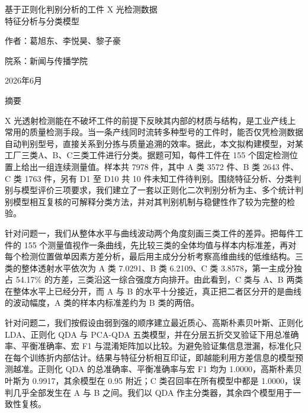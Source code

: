 \documentclass[12pt,a4paper]{article}
\begin{document}
\songti\linespread{1}\selectfont
\hypersetup{pageanchor=false}

\begin{titlepage}
\thispagestyle{empty}
\centering
\vspace*{8em}
{\heiti 基于正则化判别分析的工件 X 光检测数据\\[0.5em]特征分析与分类模型\par}
\vspace{6em}
{\songti 作者：葛旭东、李悦昊、黎子豪\par}
\vspace{2em}
{\songti 院系：新闻与传播学院\par}
\vfill
{\songti 2026年6月\par}
\end{titlepage}

\thispagestyle{empty}
\begin{center}
	{\heiti 摘\quad 要}
\end{center}

X 光透射检测能在不破坏工件的前提下反映其内部的材质与结构，是工业产线上常用的质量检测手段。当一条产线同时流转多种型号的工件时，能否仅凭检测数据自动判别型号，直接关系到分拣与质量追溯的效率。据此，本文拟构建模型，对某工厂三类A、B、C三类工件进行分类。据题可知，每件工件在 155 个固定检测位置上给出一组连续测量值。样本共 7978 件，其中 A 类 3572 件、B 类 2643 件、C 类 1763 件，另有 D1 至 D10 共 10 件未知工件待判别。围绕特征分析、分类判别与模型评价三项要求，我们建立了一套以正则化二次判别分析为主、多个统计判别模型相互复核的可解释分类方法，并对其判别机制与稳健性作了较为完整的检验。

针对问题一，我们从整体水平与曲线波动两个角度刻画三类工件的差异。把每件工件的 155 个测量值视作一条曲线，先比较三类的全体均值与样本内标准差，再对每个检测位置做单因素方差分析，最后用主成分分析考察高维曲线的低维结构。三类的整体透射水平依次为 A 类 7.0291、B 类 6.2109、C 类 3.8578，第一主成分独占 54.17\% 的方差，三类沿这一综合强度方向排开。由此看到，C 类与 A、B 两类在整体水平上已经分开，而 A 与 B 的水平十分接近，真正把二者区分开的是曲线的波动幅度，A 类的样本内标准差约为 B 类的两倍。

针对问题二，我们按假设由弱到强的顺序建立最近质心、高斯朴素贝叶斯、正则化 LDA、正则化 QDA 与 PCA-QDA 五类模型，并在分层五折交叉验证下用总准确率、平衡准确率、宏 F1 与混淆矩阵加以比较。为避免验证集信息泄漏，标准化只在每个训练折内部估计。结果与特征分析相互印证，即越能利用方差信息的模型预测越准。正则化 QDA 的总准确率、平衡准确率与宏 F1 均为 1.0000，高斯朴素贝叶斯为 0.9917，其余模型在 0.95 附近；C 类召回率在所有模型中都是 1.0000，误判几乎全部发生在 A 与 B 之间。我们以 QDA 作主分类器，其余四个模型用于一致性复核。
\end{document}
